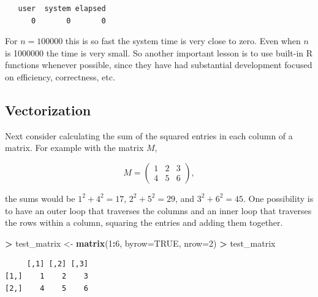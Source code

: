 \documentclass[
]{krantz}
\makeatletter
\newenvironment{Shaded}{\begin{snugshade}}{\end{snugshade}}
\newcommand{\DataTypeTok}[1]{\textcolor[rgb]{0.27,0.27,0.27}{#1}}
\newcommand{\DecValTok}[1]{\textcolor[rgb]{0.06,0.06,0.06}{#1}}
\newcommand{\KeywordTok}[1]{\textcolor[rgb]{0.27,0.27,0.27}{\textbf{#1}}}
\newcommand{\NormalTok}[1]{#1}
\newcommand{\OperatorTok}[1]{\textcolor[rgb]{0.43,0.43,0.43}{\textbf{#1}}}
\newcommand{\OtherTok}[1]{\textcolor[rgb]{0.37,0.37,0.37}{#1}}
\newcommand{\StringTok}[1]{\textcolor[rgb]{0.5,0.5,0.5}{#1}}
\newenvironment{kframe}{%
\medskip{}
\setlength{\fboxsep}{.8em}
 \def\at@end@of@kframe{}%
 \ifinner\ifhmode%
  \def\at@end@of@kframe{\end{minipage}}%
  \begin{minipage}{\columnwidth}%
 \fi\fi%
 \def\FrameCommand##1{\hskip\@totalleftmargin \hskip-\fboxsep
 \colorbox{shadecolor}{##1}\hskip-\fboxsep
     \hskip-\linewidth \hskip-\@totalleftmargin \hskip\columnwidth}%
 \MakeFramed {\advance\hsize-\width
   \@totalleftmargin\z@ \linewidth\hsize
   \@setminipage}}%
 {\par\unskip\endMakeFramed%
 \at@end@of@kframe}
\renewenvironment{Shaded}{\begin{kframe}}{\end{kframe}}
\makeatother
\begin{document}
\begin{verbatim}
   user  system elapsed 
      0       0       0 
\end{verbatim}

For \(n=100000\) this is so fast the system time is very close to zero. Even when \(n\) is 1000000 the time is very small. So another important lesson is to use built-in R functions whenever possible, since they have had substantial development focused on efficiency, correctness, etc.

\hypertarget{vectorization}{%
\subsection{Vectorization}\label{vectorization}}

Next consider calculating the sum of the squared entries in each column of a matrix. For example with the matrix \(M\),

\[
M = \left(\begin{array}{ccc}
1 & 2 & 3 \\
4 & 5 & 6
\end{array}\right),
\]

the sums would be \(1^2 + 4^2 = 17\), \(2^2 + 5^2 = 29\), and \(3^2 + 6^2 = 45\).
One possibility is to have an outer loop that traverses the columns and an inner loop that traverses the rows within a column, squaring the entries and adding them together.

\begin{Shaded}
\begin{Highlighting}[]
\OperatorTok{\textgreater{}}\StringTok{ }\NormalTok{test\_matrix \textless{}{-}}\StringTok{ }\KeywordTok{matrix}\NormalTok{(}\DecValTok{1}\OperatorTok{:}\DecValTok{6}\NormalTok{, }\DataTypeTok{byrow=}\OtherTok{TRUE}\NormalTok{, }\DataTypeTok{nrow=}\DecValTok{2}\NormalTok{)}
\OperatorTok{\textgreater{}}\StringTok{ }\NormalTok{test\_matrix}
\end{Highlighting}
\end{Shaded}

\begin{verbatim}
     [,1] [,2] [,3]
[1,]    1    2    3
[2,]    4    5    6
\end{verbatim}
\end{document}

